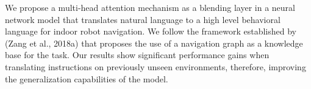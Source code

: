 We propose a multi-head attention mechanism as a blending layer in a neural network model that translates natural language to a high level behavioral language for indoor robot navigation. We follow the framework established by (Zang et al., 2018a) that proposes the use of a navigation graph as a knowledge base for the task. Our results show significant performance gains when translating instructions on previously unseen environments, therefore, improving the generalization capabilities of the model.
